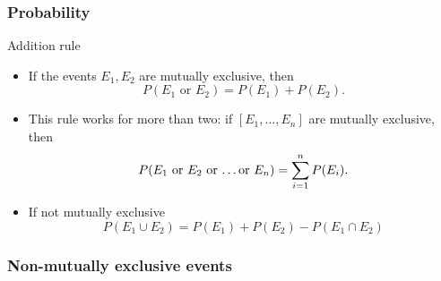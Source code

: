 \documentclass[handout]{beamer}
\begin{document}
   \begin{frame} \frametitle{Probability}

     \begin{block}
   {Addition rule}
   \begin{itemize}
   \item    If the events $E_1, E_2$ are mutually exclusive, then
   $$
   P(\text{$E_1$ or $E_2$}) = P(E_1) + P(E_2).
   $$
   \item This rule works for more than two: if $[E_1, \dots, E_n]$
     are mutually exclusive, then
   $$
   P(\text{$E_1$ or $E_2$ or \dots or $E_n$}) = \sum_{i=1}^n P(E_i).
   $$
   \item If not mutually exclusive
   $$
   P(E_1 \cup E_2) = P(E_1) + P(E_2) - P(E_1 \cap E_2)
   $$

   \end{itemize}
   \end{block}
   \end{frame}



   \begin{frame}
   \frametitle{Non-mutually exclusive events}
   \begin{center}
   \end{center}

   \end{frame}

\end{document}
